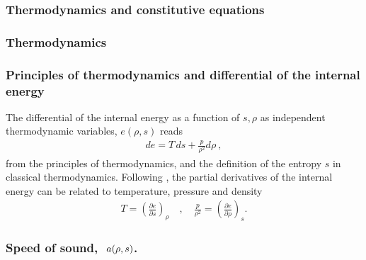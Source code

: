 \documentclass[letterpaper,10pt,english]{jupyterBook}
\begin{document}
\subsubsection{Thermodynamics and constitutive equations}
\label{\detokenize{ch/pde/hyperbolic-nd-euler:thermodynamics-and-constitutive-equations}}\label{\detokenize{ch/pde/hyperbolic-nd-euler:pde-hyperbolic-nd-euler-thermodynamics}}
\sphinxAtStartPar
{} 
\subsubsection*{Thermodynamics}
\subsubsection*{Principles of thermodynamics and differential of the internal energy}

\sphinxAtStartPar
The differential of the internal energy as a function of \(s, \rho\) as independent thermodynamic variables, \(e(\rho, s)\) reads
\begin{equation}\label{equation:ch/pde/hyperbolic-nd-euler:eq:pde:hyperbolic:euler:first-principle}
\begin{split}
  de = T \, ds + \frac{p}{\rho^2} d \rho \ ,
\end{split}
\end{equation}
\sphinxAtStartPar
from the principles of thermodynamics, and the definition of the entropy \(s\) in classical thermodynamics. Following , the partial derivatives of the internal energy can be related to temperature, pressure and density
\begin{equation}\label{equation:ch/pde/hyperbolic-nd-euler:eq:pde:hyperbolic:euler:first-principle:partial-ders}
\begin{split}
  T = \left( \frac{\partial e}{\partial s} \right)_\rho
  \quad , \quad
  \frac{p}{\rho^2} =  \left( \frac{\partial e}{\partial \rho} \right)_s .
\end{split}
\end{equation}\subsubsection*{Speed of sound, \protect\(\ a(\rho, s)\protect\).}
\end{document}
